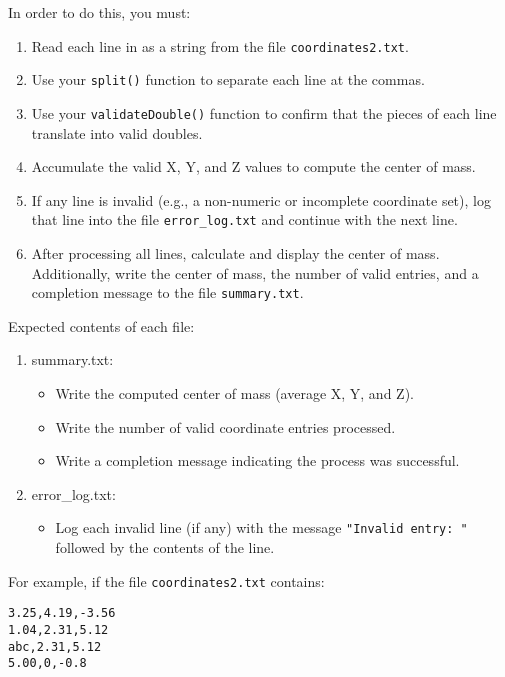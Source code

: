 In order to do this, you must:
\begin{enumerate}
    \item Read each line in as a string from the file \texttt{coordinates2.txt}.
    \item Use your \texttt{split()} function to separate each line at the commas.
    \item Use your \texttt{validateDouble()} function to confirm that the pieces of each line translate into valid doubles.
    \item Accumulate the valid X, Y, and Z values to compute the center of mass.
    \item If any line is invalid (e.g., a non-numeric or incomplete coordinate set), log that line into the file \texttt{error_log.txt} and continue with the next line.
    \item After processing all lines, calculate and display the center of mass. Additionally, write the center of mass, the number of valid entries, and a completion message to the file \texttt{summary.txt}.
\end{enumerate}

Expected contents of each file:
\begin{enumerate}
    \item summary.txt:
    \begin{itemize}
        \item Write the computed center of mass (average X, Y, and Z).
        \item Write the number of valid coordinate entries processed.
        \item Write a completion message indicating the process was successful.
    \end{itemize}
    
    \item error\_log.txt:
    \begin{itemize}
        \item Log each invalid line (if any) with the message \texttt{"Invalid entry: "} followed by the contents of the line.
    \end{itemize}
\end{enumerate}

For example, if the file \texttt{coordinates2.txt} contains:
\begin{verbatim}
3.25,4.19,-3.56
1.04,2.31,5.12
abc,2.31,5.12
5.00,0,-0.8
\end{verbatim}

